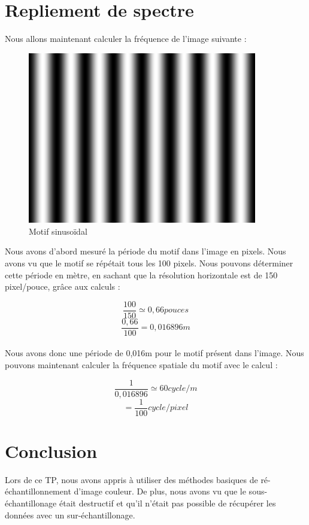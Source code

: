 \documentclass[a4paper,11pt]{article}
\begin{document}
  \newpage
  
  \section{Repliement de spectre}
  Nous allons maintenant calculer la fréquence de l'image suivante :
  \begin{figure}[H]
    \center
    \includegraphics[width=10cm]{../ti-semaine-3-sinus.png}
    \caption{Motif sinusoïdal}
  \end{figure}
  
  Nous avons d'abord mesuré la période du motif dans l'image en pixels. Nous avons vu que le motif se
  répétait tous les 100 pixels. Nous pouvons déterminer cette période en mètre, en sachant que la résolution
  horizontale est de 150 pixel/pouce, grâce aux calculs : 
  
  $$\frac{100}{150} \simeq 0,66 pouces$$
  $$\frac{0,66}{100} = 0,016896 m$$
  \ \\
  
  Nous avons donc une période de 0,016m pour le motif présent dans l'image.
  Nous pouvons maintenant calculer la fréquence spatiale du motif avec le calcul :
  
  $$\frac{1}{0,016896} \simeq 60 cycle/m$$
  $$ = \frac{1}{100} cycle/pixel$$
  
  \newpage
  
  \section*{Conclusion}
  Lors de ce TP, nous avons appris à utiliser des méthodes basiques de ré-échantillonnement d'image couleur. De plus, 
  nous avons vu que le sous-échantillonage était destructif et qu'il n'était pas possible de récupérer les données
  avec un sur-échantillonage.
 
    
\end{document}

